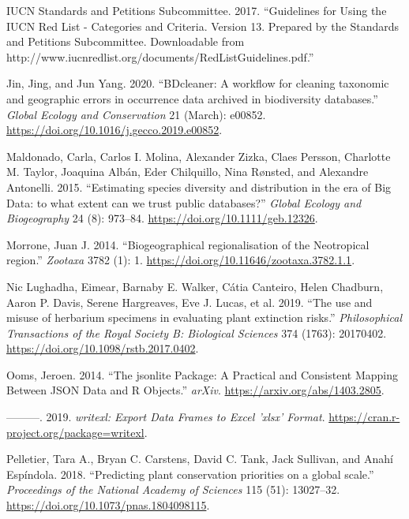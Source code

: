 \documentclass[fleqn,10pt,lineno]{wlpeerj} %
\begin{document}
\leavevmode\hypertarget{ref-IUCN2017}{}%
IUCN Standards and Petitions Subcommittee. 2017. ``Guidelines for Using the IUCN Red List - Categories and Criteria. Version 13. Prepared by the Standards and Petitions Subcommittee. Downloadable from http://www.iucnredlist.org/documents/RedListGuidelines.pdf.''

\leavevmode\hypertarget{ref-Jin2020}{}%
Jin, Jing, and Jun Yang. 2020. ``BDcleaner: A workflow for cleaning taxonomic and geographic errors in occurrence data archived in biodiversity databases.'' \emph{Global Ecology and Conservation} 21 (March): e00852. \url{https://doi.org/10.1016/j.gecco.2019.e00852}.

\leavevmode\hypertarget{ref-Maldonado2015}{}%
Maldonado, Carla, Carlos I. Molina, Alexander Zizka, Claes Persson, Charlotte M. Taylor, Joaquina Albán, Eder Chilquillo, Nina Rønsted, and Alexandre Antonelli. 2015. ``Estimating species diversity and distribution in the era of Big Data: to what extent can we trust public databases?'' \emph{Global Ecology and Biogeography} 24 (8): 973--84. \url{https://doi.org/10.1111/geb.12326}.

\leavevmode\hypertarget{ref-Morrone2014}{}%
Morrone, Juan J. 2014. ``Biogeographical regionalisation of the Neotropical region.'' \emph{Zootaxa} 3782 (1): 1. \url{https://doi.org/10.11646/zootaxa.3782.1.1}.

\leavevmode\hypertarget{ref-NicLughadha2019}{}%
Nic Lughadha, Eimear, Barnaby E. Walker, Cátia Canteiro, Helen Chadburn, Aaron P. Davis, Serene Hargreaves, Eve J. Lucas, et al. 2019. ``The use and misuse of herbarium specimens in evaluating plant extinction risks.'' \emph{Philosophical Transactions of the Royal Society B: Biological Sciences} 374 (1763): 20170402. \url{https://doi.org/10.1098/rstb.2017.0402}.

\leavevmode\hypertarget{ref-Ooms2014}{}%
Ooms, Jeroen. 2014. ``The jsonlite Package: A Practical and Consistent Mapping Between JSON Data and R Objects.'' \emph{arXiv}. \url{https://arxiv.org/abs/1403.2805}.

\leavevmode\hypertarget{ref-Ooms2019}{}%
---------. 2019. \emph{writexl: Export Data Frames to Excel 'xlsx' Format}. \url{https://cran.r-project.org/package=writexl}.

\leavevmode\hypertarget{ref-Pelletier2018}{}%
Pelletier, Tara A., Bryan C. Carstens, David C. Tank, Jack Sullivan, and Anahí Espíndola. 2018. ``Predicting plant conservation priorities on a global scale.'' \emph{Proceedings of the National Academy of Sciences} 115 (51): 13027--32. \url{https://doi.org/10.1073/pnas.1804098115}.
\end{document}
